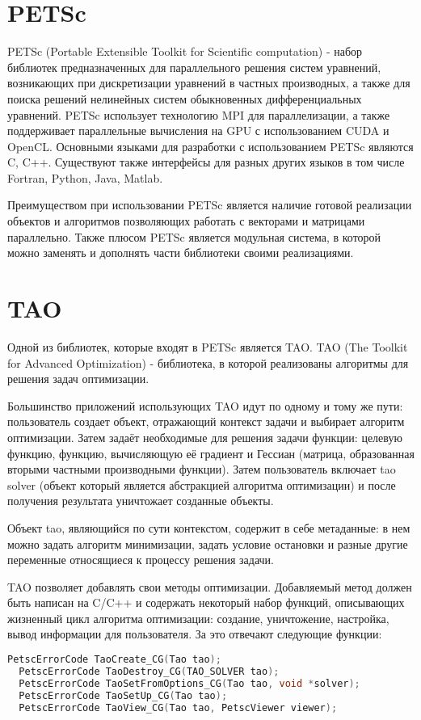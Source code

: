 \documentclass[12pt]{report}
\begin{document}
  \section{PETSc}
  PETSc (Portable Extensible Toolkit for Scientific computation) - набор
  библиотек предназначенных для параллельного решения систем уравнений,
  возникающих при дискретизации уравнений в частных производных, а также для
  поиска решений нелинейных систем обыкновенных дифференциальных уравнений.
  PETSc использует технологию MPI для параллелизации, а также поддерживает
  параллельные вычисления на GPU с использованием CUDA и OpenCL. Основными
  языками для разработки с использованием PETSc являются C, C++.
  Существуют также интерфейсы для разных других языков в том числе Fortran,
  Python, Java, Matlab.

  Преимуществом при использовании PETSc является наличие готовой реализации
  объектов и алгоритмов позволяющих работать с векторами и матрицами параллельно.
  Также плюсом PETSc является модульная система, в которой можно заменять и
  дополнять части библиотеки своими реализациями.

  \section{TAO}
  Одной из библиотек, которые входят в PETSc является TAO. TAO (The Toolkit for
  Advanced Optimization) - библиотека, в которой реализованы алгоритмы для
  решения задач оптимизации.

  Большинство приложений использующих TAO идут по одному и тому же пути: пользователь
  создает объект, отражающий контекст задачи и выбирает алгоритм оптимизации.
  Затем задаёт необходимые для решения задачи функции: целевую функцию, функцию,
  вычисляющую её градиент и Гессиан (матрица, образованная вторыми частными
  производными функции). Затем пользователь включает tao solver (объект который
  является абстракцией алгоритма оптимизации) и после получения результата уничтожает
  созданные объекты.

  Объект tao, являющийся по сути контекстом, содержит в себе метаданные: в нем
  можно задать алгоритм минимизации, задать условие остановки и разные другие
  переменные относящиеся к процессу решения задачи.

  TAO позволяет добавлять свои методы оптимизации. Добавляемый метод должен быть
  написан на C/C++ и содержать некоторый набор функций, описывающих жизненный цикл
  алгоритма оптимизации: создание, уничтожение, настройка, вывод информации для
  пользователя. За это отвечают следующие функции:
  \begin{lstlisting}[language=C, frame=single]
  PetscErrorCode TaoCreate_CG(Tao tao);
  PetscErrorCode TaoDestroy_CG(TAO_SOLVER tao);
  PetscErrorCode TaoSetFromOptions_CG(Tao tao, void *solver);
  PetscErrorCode TaoSetUp_CG(Tao tao);
  PetscErrorCode TaoView_CG(Tao tao, PetscViewer viewer);
  \end{lstlisting}
\end{document}
